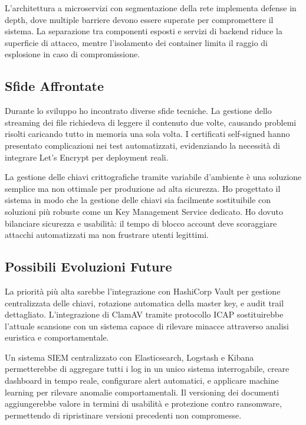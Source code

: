 \documentclass[12pt, a4paper]{article}
\begin{document}
L'architettura a microservizi con segmentazione della rete implementa defense in depth, dove multiple barriere devono essere superate per compromettere il sistema. La separazione tra componenti esposti e servizi di backend riduce la superficie di attacco, mentre l'isolamento dei container limita il raggio di esplosione in caso di compromissione.

\subsection{Sfide Affrontate}

Durante lo sviluppo ho incontrato diverse sfide tecniche. La gestione dello streaming dei file richiedeva di leggere il contenuto due volte, causando problemi risolti caricando tutto in memoria una sola volta. I certificati self-signed hanno presentato complicazioni nei test automatizzati, evidenziando la necessità di integrare Let's Encrypt per deployment reali.

La gestione delle chiavi crittografiche tramite variabile d'ambiente è una soluzione semplice ma non ottimale per produzione ad alta sicurezza. Ho progettato il sistema in modo che la gestione delle chiavi sia facilmente sostituibile con soluzioni più robuste come un Key Management Service dedicato. Ho dovuto bilanciare sicurezza e usabilità: il tempo di blocco account deve scoraggiare attacchi automatizzati ma non frustrare utenti legittimi.

\subsection{Possibili Evoluzioni Future}

La priorità più alta sarebbe l'integrazione con HashiCorp Vault per gestione centralizzata delle chiavi, rotazione automatica della master key, e audit trail dettagliato. L'integrazione di ClamAV tramite protocollo ICAP sostituirebbe l'attuale scansione con un sistema capace di rilevare minacce attraverso analisi euristica e comportamentale.

Un sistema SIEM centralizzato con Elasticsearch, Logstash e Kibana permetterebbe di aggregare tutti i log in un unico sistema interrogabile, creare dashboard in tempo reale, configurare alert automatici, e applicare machine learning per rilevare anomalie comportamentali. Il versioning dei documenti aggiungerebbe valore in termini di usabilità e protezione contro ransomware, permettendo di ripristinare versioni precedenti non compromesse.
\end{document}
